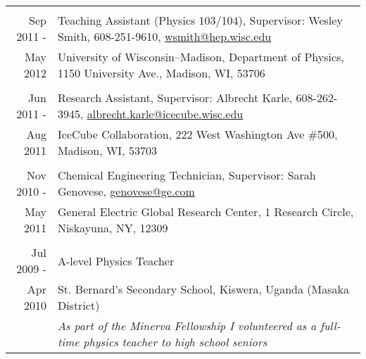 \documentclass[10pt]{article} %
\begin{document}
\begin{tabulary}{\textwidth}{RL}
\vspace{5pt} \\

Sep 2011 -     & Teaching Assistant (Physics 103/104), Supervisor: Wesley Smith, 608-251-9610, \href{mailto:wsmith@hep.wisc.edu}{wsmith@hep.wisc.edu} \\
 May 2012      & University of Wisconsin--Madison, Department of Physics, 1150 University Ave., Madison, WI, 53706 \\ %

\vspace{5pt} \\

Jun 2011 -     & Research Assistant, Supervisor: Albrecht Karle, 608-262-3945, \href{mailto:albrecht.karle@icecube.wisc.edu}{albrecht.karle@icecube.wisc.edu} \\
 Aug 2011      & IceCube Collaboration, 222 West Washington Ave \#500, Madison, WI, 53703 \\ %

\vspace{5pt} \\

Nov 2010 -     & Chemical Engineering Technician, Supervisor: Sarah Genovese, \href{mailto:genovese@ge.com}{genovese@ge.com} \\
 May 2011      & General Electric Global Research Center, 1 Research Circle, Niskayuna, NY, 12309 \\ %

\vspace{5pt} \\

Jul 2009 -     & A-level Physics Teacher \\
 Apr 2010      & St. Bernard's Secondary School, Kiswera, Uganda (Masaka District) \\
 {}            & \emph{As part of the Minerva Fellowship I volunteered as a full-time physics teacher to high school seniors} \\ %

%


\end{tabulary}
\end{document}
